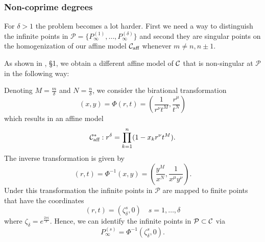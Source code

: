 \documentclass[main.tex]{subfiles}
\begin{document}
 \subsubsection{Non-coprime degrees}\label{subsec:ajm_inf_ncop}

  For $\delta > 1$ the problem becomes a lot harder. First we need a way to distinguish the infinite points in $\mathcal{P}
  = \{ P_{\infty}^{(1)},\dots, P_{\infty}^{(\delta)} \}$ and second they are singular points
  on the homogenization of our affine model $\mathcal{C}_{\text{aff}}$
  whenever $m \ne n,n\pm1$.
  
  As shown in \cite{CT1996}, \S 1, we obtain a different affine model of $\mathcal{C}$ that is non-singular at $\mathcal{P}$
  in the following way:
  
  Denoting $M = \frac{m}\delta$ and $N = \frac{n}\delta$, we consider the birational transformation
  \begin{equation}
   (x,y) = \Phi(r,t) = \left(\frac{1}{r^{\nu}t^M},\frac{r^{\mu}}{t^N}\right)
  \end{equation}
  which results in an affine model
  \begin{equation}
   \mathcal{C}_{\text{aff}}^{*} : r^{\delta} = \prod_{k=1}^n (1-x_kr^{\nu}t^M).
  \end{equation}
  The inverse transformation is given by
  \begin{equation}
   (r,t) = \Phi^{-1}(x,y) = \left(\frac{y^M}{x^N},\frac{1}{x^{\mu}y^{\nu}}\right).
  \end{equation}
  Under this transformation the infinite points in $\mathcal{P}$ are mapped to finite points that have the coordinates
  \begin{equation}
   (r,t) = (\zeta_{\delta}^s,0) \quad s= 1,\dots,\delta
  \end{equation}
  where $\zeta_{\delta} = e^{\frac{2\pi i }{\delta}}$. 
  Hence, we can identify the infinite points in $\mathcal{P} \subset \mathcal{C}$ via
   \begin{equation}
      P_{\infty}^{(s)} = \Phi^{-1}(\zeta_{\delta}^s,0).
   \end{equation}
   
\end{document}
